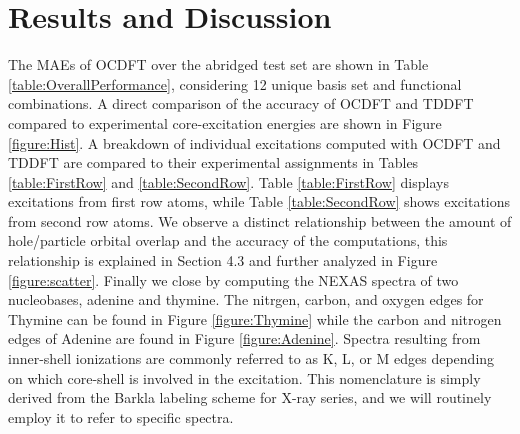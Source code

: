 \documentclass[12pt]{article}
\begin{document}
\section{Results and Discussion}
The MAEs of OCDFT over the abridged test set are shown in Table \ref{table:OverallPerformance}, considering 12 unique basis set and functional combinations. A direct comparison of the accuracy of OCDFT and TDDFT compared to experimental core-excitation energies are shown in Figure \ref{figure:Hist}. A breakdown of individual excitations computed with OCDFT and TDDFT are compared to their experimental assignments in Tables \ref{table:FirstRow} and \ref{table:SecondRow}. Table \ref{table:FirstRow} displays excitations from first row atoms, while Table \ref{table:SecondRow} shows excitations from second row atoms. We observe a distinct relationship between the amount of hole/particle orbital overlap and the accuracy of the computations, this relationship is explained in Section 4.3 and further analyzed in Figure \ref{figure:scatter}. Finally we close by computing the NEXAS spectra of two nucleobases, adenine and thymine. The nitrgen, carbon, and oxygen edges for Thymine can be found in Figure \ref{figure:Thymine} while the carbon and nitrogen edges of Adenine are found in Figure \ref{figure:Adenine}. Spectra resulting from inner-shell ionizations are commonly referred to as K, L, or M edges depending on which core-shell is involved in the excitation. This nomenclature is simply derived from the Barkla labeling scheme for X-ray series, and we will routinely employ it to refer to specific spectra.
\end{document}
